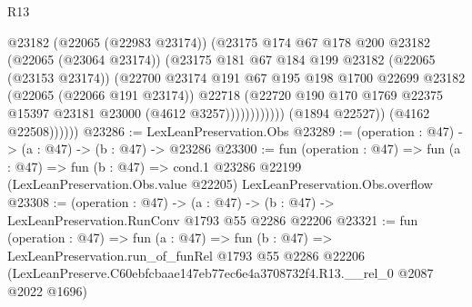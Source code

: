 \begin{lexlean}{R13}
\begin{coremodule}
                              @23182
                              (@22065 (@22983 @23174))
                              (@23175
                                @174
                                @67
                                @178
                                @200
                                @23182
                                (@22065 (@23064 @23174))
                                (@23175
                                  @181
                                  @67
                                  @184
                                  @199
                                  @23182
                                  (@22065 (@23153 @23174))
                                  (@22700
                                    @23174
                                    @191
                                    @67
                                    @195
                                    @198
                                    @1700
                                    @22699
                                    @23182
                                    (@22065 (@22066 @191 @23174))
                                    @22718
                                    (@22720
                                      @190
                                      @170
                                      @1769
                                      @22375
                                      @15397
                                      @23181
                                      @23000
                                      (@4612 @3257))))))))))))
                (@1894 @22527))
              (@4162 @22508))))))
@23286 := LexLeanPreservation.Obs
@23289 := (operation : @47) -> (a : @47) -> (b : @47) -> @23286
@23300 := fun (operation : @47) =>
  fun (a : @47) =>
  fun (b : @47) =>
  cond.{1} @23286 @22199 (LexLeanPreservation.Obs.value @22205) LexLeanPreservation.Obs.overflow
@23308 := (operation : @47) ->
  (a : @47) -> (b : @47) -> LexLeanPreservation.RunConv @1793 @55 @2286 @22206
@23321 := fun (operation : @47) =>
  fun (a : @47) =>
  fun (b : @47) =>
  LexLeanPreservation.run_of_funRel
    @1793
    @55
    @2286
    @22206
    (LexLeanPreserve.C60ebfcbaae147eb77ec6e4a3708732f4.R13.__rel_0 @2087 @2022 @1696)
\end{coremodule}
\end{lexlean}

